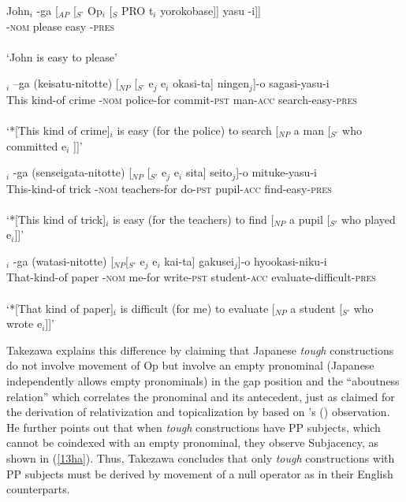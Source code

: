\documentclass[output=paper,colorlinks,citecolor=brown,
]{langscibook}
\begin{document}
\begin{exe}
\ex \label{11ha}
\gll John$_{i}$ -ga [$_{AP}$ [$_{S’}$ Op$_{i}$ [$_{S}$ PRO t$_{i}$ yorokobase]] yasu -i]]\\
{} -\textsc{nom} {} {} {} {} {} {} please easy -\textsc{pres}\\\\
‘John is easy to please’

\ex \label{12ha}
\begin{xlist}
\ex \label{12aha}
$_{i}$ –ga (keisatu-nitotte) [$_{NP}$ [$_{S’}$ e$_{j}$ e$_{i}$ okasi-ta] ningen$_{j}$]-o  sagasi-yasu-i\\
This kind-of crime -\textsc{nom} police-for {} {} {} {} commit-\textsc{pst} man-\textsc{acc} search-easy-\textsc{pres}\\\\
`*[This kind of crime]$_{i}$ is easy (for the police) to search [$_{NP}$ a man [$_{S'}$ who committed e$_{i}$ ]]'

\ex \label{12bha}
$_{i}$ -ga (senseigata-nitotte) [$_{NP}$ [$_{S'}$ e$_{j}$ e$_{i}$ sita] seito$_{j}$]-o    mituke-yasu-i\\
This-kind-of trick -\textsc{nom} teachers-for {} {} {} {} do-\textsc{pst} pupil-\textsc{acc} find-easy-\textsc{pres}\\\\
 `*[This kind of trick]$_{i}$ is easy (for the teachers) to find [$_{NP}$ a pupil [$_{S'}$ who played e$_{i}$]]'



\ex \label{12cha}
$_{i}$ -ga (watasi-nitotte) [$_{NP}$[$_{S'}$ e$_{j}$ e$_{i}$ kai-ta] gakusei$_{j}$]-o  hyookasi-niku-i\\
That-kind-of paper  -\textsc{nom}  me-for  {} {} {}   write-\textsc{pst} student-\textsc{acc} evaluate-difficult-\textsc{pres}\\\\
`*[That kind of paper]$_{i}$ is difficult (for me) to evaluate [$_{NP}$ a student [$_{S'}$ who wrote e$_{i}$]]’ \hspace{30mm} \citep[203]{takezawa1987}                   
\end{xlist}
\end{exe}

Takezawa explains this difference by claiming that Japanese \textit{tough} constructions do not involve movement of Op but involve an empty pronominal (Japanese independently allows empty pronominals) in the gap position and the “aboutness relation” which correlates the pronominal and its antecedent, just as claimed for the derivation of relativization and topicalization by \citet{Saito1985} based on \citeauthor{kuno1973}’s (\citeyear{kuno1973}) observation. He further points out that when \textit{tough} constructions have PP subjects, which cannot be coindexed with an empty pronominal, they observe Subjacency, as shown in (\ref{13ha}). Thus, Takezawa concludes that only \textit{tough} constructions with PP subjects must be derived by movement of a null operator as in their English counterparts.
\end{document}
